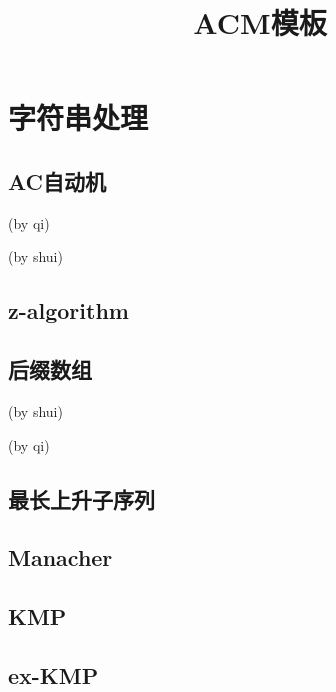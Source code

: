 \documentclass{ctexart}
\begin{document}
  

\begin{titlepage} %
\title{ACM模板}
\maketitle
\setcounter{page}{0}
\thispagestyle{empty}
\end{titlepage}


\tableofcontents %
\newpage


\section{字符串处理}
\subsection{AC自动机}
(by qi)

(by shui)

\subsection{z-algorithm}

\subsection{后缀数组}
(by shui)

(by qi)

\subsection{最长上升子序列}

\subsection{Manacher}

\subsection{KMP}

\subsection{ex-KMP}

\end{document}
